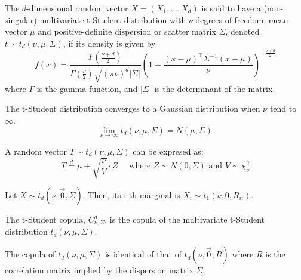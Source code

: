 \documentclass[11pt,fleqn]{book} %
\begin{document}
\begin{definition}
	The $d$-dimensional random vector $X=(X_1,\dots,X_d)$ is said to have a 
	(non-singular) multivariate t-Student distribution with $\nu$ degrees of freedom, 
	mean vector $\mu$ and positive-definite dispersion or scatter matrix $\Sigma$, 
	denoted $t \sim t_d(\nu,\mu,\Sigma)$, if its density is given by
	\begin{displaymath}
		f(x)=\frac{\Gamma\left(\frac{\nu+d}{2}\right)}{\Gamma\left(\frac{\nu}{2}\right)\sqrt{(\pi \nu)^d |\Sigma|}}
		\left(
		1+ \frac{(x-\mu)^\top\Sigma^{-1}(x-\mu)}{\nu}
		\right)^{-\frac{\nu+d}{2}}
	\end{displaymath}
	\noindent where $\Gamma$ is the gamma function, and $|\Sigma|$ is the 
	determinant of the matrix.
\end{definition}

\begin{proposition}
	The t-Student distribution converges to a Gaussian distribution 
	when $\nu$ tend to $\infty$.
	\begin{displaymath}
		\lim_{\nu \to \infty} t_d(\nu,\mu,\Sigma) = N(\mu,\Sigma)
	\end{displaymath}
\end{proposition}

\begin{proposition}
	\label{prop:mtschar}
	A random vector $T \sim t_d(\nu,\mu,\Sigma)$ can be expresed as:
	\begin{displaymath}
		T \stackrel{d}{=} \mu + \sqrt{\frac{\nu}{V}}\cdot Z
		\quad \text{ where } Z \sim N(0,\Sigma) \text{ and } V \sim \chi_{\nu}^2
	\end{displaymath}
\end{proposition}

\begin{proposition}
	Let $X \sim t_d(\nu,\vec{0},\Sigma)$. Then, its i-th marginal is 
	$X_i \sim t_1(\nu,0,R_{ii})$.
\end{proposition}

\begin{definition}
	The t-Student copula, $C_{\nu,\Sigma}^d$, is the copula of the multivariate 
	t-Student distribution $t_d(\nu,\mu,\Sigma)$.
\end{definition}

\begin{proposition}
	The copula of $t_d(\nu,\mu,\Sigma)$ is identical of that of $t_d(\nu,\vec{0},R)$
	where $R$ is the correlation matrix implied by the dispersion matrix $\Sigma$.
\end{proposition}
\end{document}
